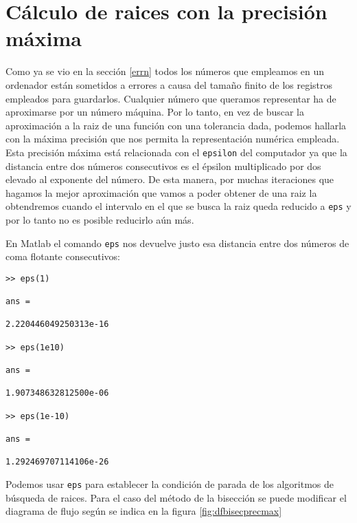 \section{Cálculo de raices con la precisión máxima}
Como ya se vio en la sección \ref{errn} todos los números que empleamos en un ordenador están sometidos a errores a causa del tamaño finito de los registros empleados para guardarlos. Cualquier número que queramos representar ha de aproximarse por un número máquina. Por lo tanto, en vez de buscar la aproximación a la raiz de una función con una tolerancia dada, podemos hallarla con la máxima precisión que nos permita la representación numérica empleada. Esta precisión máxima está relacionada con el \texttt{epsilon} del computador ya que la distancia entre dos números consecutivos es el épsilon multiplicado por dos elevado al exponente del número. De esta manera, por muchas iteraciones que hagamos la mejor aproximación que vamos a poder obtener de una raiz la obtendremos cuando el intervalo en el que se busca la raiz queda reducido a \texttt{eps} y por lo tanto no es posible reducirlo aún más. 

En Matlab el comando  \texttt{eps} nos devuelve justo esa distancia entre dos números de coma flotante consecutivos:

\begin{verbatim}
>> eps(1)

ans =

2.220446049250313e-16

>> eps(1e10)

ans =

1.907348632812500e-06

>> eps(1e-10)

ans =

1.292469707114106e-26

\end{verbatim}

Podemos usar \texttt{eps} para establecer la condición de parada de los algoritmos de búsqueda de raices. Para el caso del método de la bisección se puede modificar el diagrama de flujo según se indica en la figura \ref{fig:dfbisecprecmax}
	
